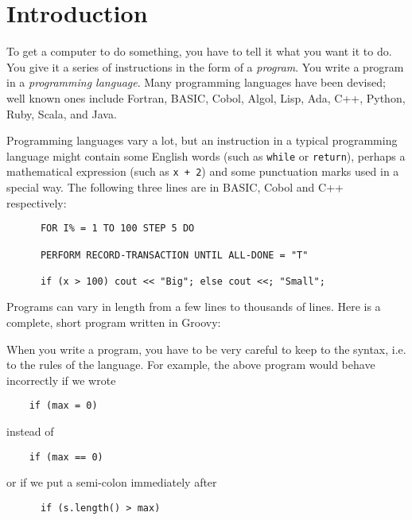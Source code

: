 \section{Introduction}


To get a computer to do something, you have to tell it what you want it
to do.  You give it a series of instructions in the form of a \emph{program}.
You write a program in a \emph{programming language}.
Many programming languages have been devised; well known ones include
Fortran, BASIC, Cobol, Algol, Lisp, Ada, C++, Python, Ruby, Scala, and Java.

Programming languages vary a lot, but
an instruction in a typical programming language might contain
some English words (such as \verb!while! or \verb!return!), perhaps a mathematical
expression (such as \verb!x + 2!) and some punctuation marks used in a special way.
The following three lines are in BASIC, Cobol and C++ respectively:
\begin{Verbatim}
      FOR I% = 1 TO 100 STEP 5 DO

      PERFORM RECORD-TRANSACTION UNTIL ALL-DONE = "T"

      if (x > 100) cout << "Big"; else cout <<; "Small";
\end{Verbatim}

Programs can vary in length from a few lines to thousands of lines.
Here is a complete, short program written in Groovy:


When you write a program, you have to be very careful to keep to the
syntax, i.e. to the rules of the language.  For example, the above program would
behave incorrectly if we wrote 

\begin{Verbatim}
	if (max = 0)
\end{Verbatim}

instead of 

\begin{Verbatim}
	if (max == 0)
\end{Verbatim}

or if we put a semi-colon immediately after 

\begin{Verbatim}
      if (s.length() > max)
\end{Verbatim}


